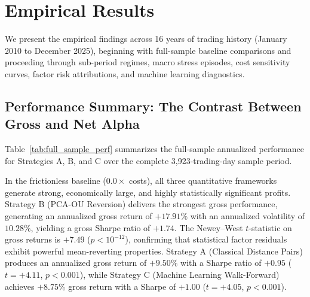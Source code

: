 \documentclass[11pt,a4paper]{article}
\begin{document}
\section{Empirical Results}
\label{sec:results}

We present the empirical findings across 16 years of trading history (January 2010 to December 2025), beginning with full-sample baseline comparisons and proceeding through sub-period regimes, macro stress episodes, cost sensitivity curves, factor risk attributions, and machine learning diagnostics.

\subsection{Performance Summary: The Contrast Between Gross and Net Alpha}
Table~\ref{tab:full_sample_perf} summarizes the full-sample annualized performance for Strategies A, B, and C over the complete 3,923-trading-day sample period.

\begin{table}[htbp]
\centering
\caption{Full-Sample Annualized Strategy Performance on the NSE F\&O Universe (2010--2025)}
\label{tab:full_sample_perf}
\end{table}

In the frictionless baseline ($0.0\times$ costs), all three quantitative frameworks generate strong, economically large, and highly statistically significant profits. Strategy B (PCA-OU Reversion) delivers the strongest gross performance, generating an annualized gross return of $+17.91\%$ with an annualized volatility of $10.28\%$, yielding a gross Sharpe ratio of $+1.74$. The Newey--West $t$-statistic on gross returns is $+7.49$ ($p < 10^{-12}$), confirming that statistical factor residuals exhibit powerful mean-reverting properties. Strategy A (Classical Distance Pairs) produces an annualized gross return of $+9.50\%$ with a Sharpe ratio of $+0.95$ ($t = +4.11$, $p < 0.001$), while Strategy C (Machine Learning Walk-Forward) achieves $+8.75\%$ gross return with a Sharpe of $+1.00$ ($t = +4.05$, $p < 0.001$).
\end{document}
